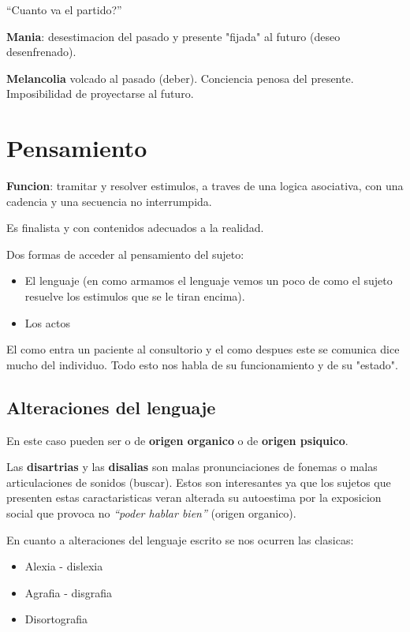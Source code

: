 \documentclass[12pt,a4paper]{article}
\begin{document}
\enquote{Cuanto va el partido?}

\textbf{Mania}: desestimacion del pasado y presente "fijada" al futuro (deseo desenfrenado). 

\textbf{Melancolia} volcado al pasado (deber). Conciencia penosa del presente. Imposibilidad de proyectarse al futuro. 

\section{Pensamiento}%
\label{sec:pensamiento} 

\textbf{Funcion}: tramitar y resolver estimulos, a traves de una logica asociativa, con una cadencia y una secuencia no interrumpida. 

Es finalista y con contenidos adecuados a la realidad. 

Dos formas de acceder al pensamiento del sujeto:

\begin{itemize}
	\item El lenguaje (en como armamos el lenguaje vemos un poco de como el sujeto resuelve los estimulos que se le tiran encima).

	\item Los actos
\end{itemize}

El como entra un paciente al consultorio y el como despues este se comunica dice mucho del individuo. Todo esto nos habla de su funcionamiento y de su "estado". 

\subsection{Alteraciones del lenguaje}%
\label{sec:alteraciones_del_lenguaje}

En este caso pueden ser o de \textbf{origen organico} o de \textbf{origen psiquico}.

Las \textbf{disartrias} y las \textbf{disalias} son malas pronunciaciones de fonemas o malas articulaciones de sonidos (buscar). Estos son interesantes ya que los sujetos que presenten estas caractaristicas veran alterada su autoestima por la exposicion social que provoca no \textit{\enquote{poder hablar bien}} (origen organico).  

En cuanto a alteraciones del lenguaje escrito se nos ocurren las clasicas:
\begin{itemize}
	\item Alexia - dislexia
	\item Agrafia - disgrafia
	\item Disortografia
\end{itemize}
\end{document}
